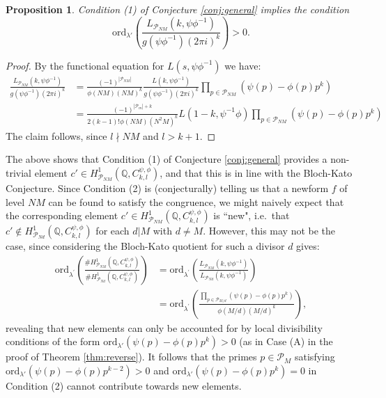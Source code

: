 \documentclass{amsart}
\theoremstyle{plain}
\newtheorem{propn}[theorem]{Proposition}
\theoremstyle{definition}
\begin{document}
\begin{propn}
\label{propn:divideL}
     Condition (1) of Conjecture \ref{conj:general} implies the condition \[\text{ord}_{\lambda'}\left( \frac{L_{\mathcal{P}_{NM}}(k, \psi\phi^{-1})}{g(\psi\phi^{-1})(2\pi i)^k}\right)>0.\]
\end{propn}

\begin{proof}
    By the functional equation for $L(s,\psi\phi^{-1})$ we have: 
    \begin{align*}
        \frac{L_{\mathcal{P}_{NM}}(k, \psi\phi^{-1})}{g(\psi\phi^{-1})(2\pi i)^k} &= \frac{(-1)^{|\mathcal{P}_{NM}|}}{\phi(NM)(NM)^k}\frac{L(k, \psi \phi^{-1})}{ g(\psi\phi^{-1})(2\pi i)^k}\prod_{p \in \mathcal{P}_{NM}} (\psi(p)-\phi(p)p^k)\\ &=\frac{(-1)^{|\mathcal{P}_m|+k}}{2(k-1)!\phi(NM)(N^2M)^k}L(1-k,\psi^{-1}\phi)\prod_{p \in \mathcal{P}_{NM}} (\psi(p)-\phi(p)p^k)
    \end{align*}
    The claim follows, since $l\nmid NM$ and $l>k+1$.
\end{proof}
The above shows that Condition (1) of Conjecture \ref{conj:general} provides a non-trivial element $c'\in H^1_{\mathcal{P}_{NM}}(\mathbb{Q},C_{k,l}^{\psi,\phi})$, and that this is in line with the Bloch-Kato Conjecture. Since Condition (2) is (conjecturally) telling us that a newform $f$ of level $NM$ can be found to satisfy the congruence, we might naively expect that the corresponding element $c'\in H^1_{
\mathcal{P}_{NM}}(\mathbb{Q},C_{k,l}^{\psi,\phi})$ is ``new", i.e.\ that $c'\notin H^1_{\mathcal{P}_{Nd}}(\mathbb{Q},C_{k,l}^{\psi,\phi})$ for each $d| M$ with $d\neq M$. However, this may not be the case, since considering the Bloch-Kato quotient for such a divisor $d$ gives: \begin{align*}
    \text{ord}_{\lambda^\prime}\left( \frac{ \#H^1_{\mathcal{P}_{NM}}(\mathbb{Q},C_{k,l}^{\psi,\phi})}{\#H^1_{\mathcal{P}_{Nd}}(\mathbb{Q},C_{k,l}^{\psi,\phi})}\right) &= \text{ord}_{\lambda^\prime}\left( \frac{L_{\mathcal{P}_{NM}}(k, \psi\phi^{-1})}{L_{\mathcal{P}_{Nd}}(k, \psi\phi^{-1})} \right)\\ &=\text{ord}_{\lambda^\prime}\left( \frac{\prod_{p \in \mathcal{P}_{M/d}}(\psi(p)-\phi(p)p^k)}{\phi(M/d)(M/d)^k}\right),
\end{align*}
revealing that new elements can only be accounted for by local divisibility conditions of the form $\text{ord}_{\lambda'}(\psi(p)-\phi(p)p^k)>0$ (as in Case (A) in the proof of Theorem \ref{thm:reverse}). It follows that the primes $p\in\mathcal{P}_M$ satisfying $\text{ord}_{\lambda'}(\psi(p)-\phi(p)p^{k-2})>0$ and $\text{ord}_{\lambda'}(\psi(p)-\phi(p)p^k)=0$ in Condition (2) cannot contribute towards new elements.
 
\end{document}
